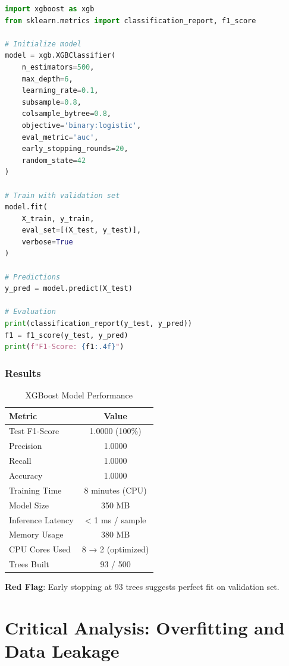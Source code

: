 \documentclass[11pt,conference]{IEEEtran}
\begin{document}
\begin{lstlisting}[language=Python]
import xgboost as xgb
from sklearn.metrics import classification_report, f1_score

# Initialize model
model = xgb.XGBClassifier(
    n_estimators=500,
    max_depth=6,
    learning_rate=0.1,
    subsample=0.8,
    colsample_bytree=0.8,
    objective='binary:logistic',
    eval_metric='auc',
    early_stopping_rounds=20,
    random_state=42
)

# Train with validation set
model.fit(
    X_train, y_train,
    eval_set=[(X_test, y_test)],
    verbose=True
)

# Predictions
y_pred = model.predict(X_test)

# Evaluation
print(classification_report(y_test, y_pred))
f1 = f1_score(y_test, y_pred)
print(f"F1-Score: {f1:.4f}")
\end{lstlisting}

\subsubsection{Results}

\begin{table}[h]
\centering
\caption{XGBoost Model Performance}
\begin{tabular}{|l|c|}
\hline
\textbf{Metric} & \textbf{Value} \\
\hline
Test F1-Score & 1.0000 (100\%) \\
\hline
Precision & 1.0000 \\
\hline
Recall & 1.0000 \\
\hline
Accuracy & 1.0000 \\
\hline
Training Time & 8 minutes (CPU) \\
\hline
Model Size & 350 MB \\
\hline
Inference Latency & < 1 ms / sample \\
\hline
Memory Usage & 380 MB \\
\hline
CPU Cores Used & 8 → 2 (optimized) \\
\hline
Trees Built & 93 / 500 \\
\hline
\end{tabular}
\end{table}

\textbf{Red Flag}: Early stopping at 93 trees suggests perfect fit on validation set.

\section{Critical Analysis: Overfitting and Data Leakage}
\end{document}
